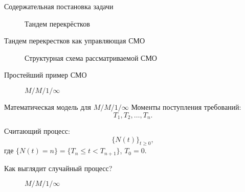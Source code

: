 \documentclass[10pt]{beamer}
\begin{document}
\begin{frame}{Содержательная постановка задачи}
        \begin{figure}[h]
    \centering
    \caption{Тандем перекрёстков}
    \label{VK:fig:1}
  \end{figure}
\end{frame}
























\begin{frame}{Тандем перекрестков как управляющая СМО}
  \begin{figure}[h]
    \centering
    \caption{Структурная схема рассматриваемой СМО}
    \label{VK:fig:2}
  \end{figure}
\end{frame} 


\begin{frame}{Простейший пример СМО}
      \begin{figure}[h]
    \centering
    \caption{$M/M/1/\infty$}
    \label{VK:fig:3}
  \end{figure}
\end{frame}

\begin{frame}{Математическая модель для $M/M/1/\infty$ }
Моменты поступления требований: 
$$
T_1, T_2, \ldots, T_n . 
$$

Считающий процесс: 
$$
\{N(t)\}_{t\geqslant 0},
$$
где $\{N(t) = n\} = \{T_n \leqslant t < T_{n+1}\}$, $T_0=0$.



\end{frame}

\begin{frame}{Как выглядит случайный процесс?}
          \begin{figure}[h]
    \centering
    \caption{$M/M/1/\infty$}
    \label{VK:fig:3}
  \end{figure}
\end{frame}
\end{document}
